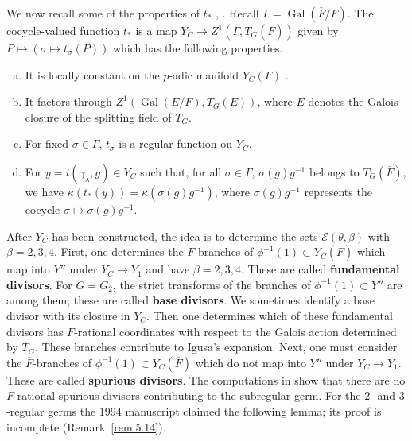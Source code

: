 \documentclass[12pt,letterpaper]{amsart}
\theoremstyle{plain}
\theoremstyle{definition}
\theoremstyle{remark}
\theoremstyle{definition}
\newcommand{\ovF}{\overline{F}}
\DeclareMathOperator{\Gal}{Gal}
\begin{document}
We now recall some of the properties of $t_*$ \cite{La83},
\cite{Ha92a}. Recall $\Gamma=\Gal(\overline{F}/F)$.
The cocycle-valued function $t_*$ is a map
$Y_C\rightarrow Z^1(\Gamma, T_G(\overline{F}))$ given by
$P\longmapsto (\sigma\longmapsto t_\sigma(P))$
which has the following properties.
\begin{enumerate}[(a)]
\item It is locally constant on the $p$-adic manifold $Y_C(F)$ \cite{La83}.
\item It factors through $Z^1(\Gal(E/F), T_G(E))$,
where $E$ denotes the Galois closure of the splitting
field of $T_G$.
\item For fixed $\sigma\in \Gamma$, $t_\sigma$ is a regular function on
$Y_C$.
\item For $y=i(\gamma_\lambda ,g)\in Y_C$ such that, for all
$\sigma\in \Gamma$,
$\sigma(g)g^{-1}$ belongs to $T_G(\overline{F})$, we have
$\kappa (t_*(y))=\kappa(\sigma(g)g^{-1})$, where
$\sigma(g)g^{-1}$ represents
the cocycle $\sigma\longmapsto \sigma(g)g^{-1}$.
\end{enumerate}

After $Y_C$ has been constructed, the idea is to determine the sets
${\mathcal E}(\theta, \beta)$ with $\beta =2,3,4$. First,
one determines the $\ovF$-branches of $\phi^{-1}(1)\subset Y_C(\ovF)$ which
map into $Y''$ under $Y_C\rightarrow Y_1$ and have
$\beta =2,3,4$. These are called \textbf{fundamental divisors}.
For $G=G_2$, the strict transforms of the branches of
$\phi^{-1}(1)\subset Y''$ are among them; these are called
\textbf{base divisors}. We sometimes identify a base divisor with its closure
in $Y_C$. Then one determines which of these fundamental divisors
has $F$-rational
coordinates with respect to the Galois action determined by $T_G$.
These branches contribute to Igusa's
expansion. Next, one must consider the $\ovF$-branches of
$\phi^{-1}(1)\subset Y_C(\ovF)$ which do not
map into $Y''$ under $Y_C\rightarrow Y_1$. These are
called \textbf{spurious divisors}.
The computations in \cite[Ch.~III]{Ha92a} show that there are
no $F$-rational spurious divisors contributing to the subregular germ.
For the $2$- and $3$-regular germs the 1994 manuscript claimed the following
lemma; its proof is incomplete (Remark~\ref{rem:5.14}).
\end{document}
